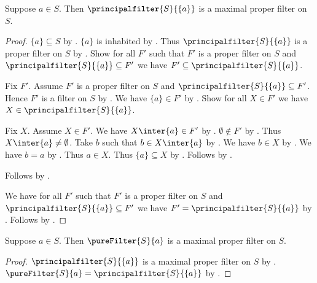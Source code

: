 \begin{proposition}\label{principalfilter_singleton_is_maximal_proper_filter}
    Suppose $a\in S$.
    Then $\principalfilter{S}{\{a\}}$ is a maximal proper filter on $S$.
\end{proposition}
\begin{proof}
    $\{a\}\subseteq S$ by .
    $\{a\}$ is inhabited by .
    Thus $\principalfilter{S}{\{a\}}$ is a proper filter on $S$
        by .
    Show for all $F'$ such that $F'$ is a proper filter on $S$
        and $\principalfilter{S}{\{a\}}\subseteq F'$
        we have $F'\subseteq\principalfilter{S}{\{a\}}$.
    \begin{subproof}
        Fix $F'$.
        Assume $F'$ is a proper filter on $S$
            and $\principalfilter{S}{\{a\}}\subseteq F'$.
        Hence $F'$ is a filter on $S$ by .
        We have $\{a\}\in F'$
            by .
        Show for all $X\in F'$ we have $X\in\principalfilter{S}{\{a\}}$.
        \begin{subproof}
            Fix $X$.
            Assume $X\in F'$.
            We have $X\inter\{a\}\in F'$
                by .
            $\emptyset\notin F'$ by .
            Thus $X\inter\{a\}\neq\emptyset$.
            Take $b$ such that $b\in X\inter\{a\}$
                by .
            We have $b\in X$ by .
            We have $b = a$ by .
            Thus $a\in X$.
            Thus $\{a\}\subseteq X$ by .
            Follows by .
        \end{subproof}
        Follows by .
    \end{subproof}
    We have for all $F'$ such that $F'$ is a proper filter on $S$
        and $\principalfilter{S}{\{a\}}\subseteq F'$
        we have $F'=\principalfilter{S}{\{a\}}$
        by .
    Follows by .
\end{proof}

\begin{corollary}\label{pure_filter_is_maximal_proper_filter}
    Suppose $a\in S$.
    Then $\pureFilter{S}{a}$ is a maximal proper filter on $S$.
\end{corollary}
\begin{proof}
    $\principalfilter{S}{\{a\}}$ is a maximal proper filter on $S$ by
        .
    $\pureFilter{S}{a}=\principalfilter{S}{\{a\}}$ by
        .
\end{proof}
